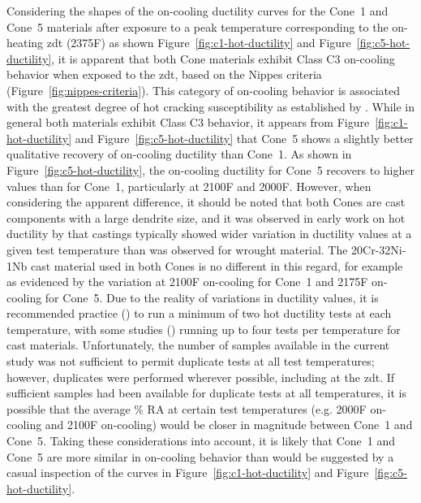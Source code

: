 Considering the shapes of the on-cooling ductility curves for the Cone~1 and Cone~5 materials after exposure to a peak temperature corresponding to the on-heating \gls{zdt} (2375\textdegree{}F) as shown Figure~\ref{fig:c1-hot-ductility} and Figure~\ref{fig:c5-hot-ductility}, it is apparent that both Cone materials exhibit Class C3 on-cooling behavior when exposed to the \gls{zdt}, based on the Nippes criteria (Figure~\ref{fig:nippes-criteria}).  This category of on-cooling behavior is associated with the greatest degree of hot cracking susceptibility as established by \citet{nippes_further_1957}.  While in general both materials exhibit Class C3 behavior, it appears from Figure~\ref{fig:c1-hot-ductility} and Figure~\ref{fig:c5-hot-ductility} that Cone~5 shows a slightly better qualitative recovery of on-cooling ductility than Cone~1.  As shown in Figure~\ref{fig:c5-hot-ductility}, the on-cooling ductility for Cone~5 recovers to higher values than for Cone~1, particularly at 2100\textdegree{}F and 2000\textdegree{}F.  However, when considering the apparent difference, it should be noted that both Cones are cast components with a large dendrite size, and it was observed in early work on hot ductility by \citet{nippes_further_1957} that castings typically showed wider variation in ductility values at a given test temperature than was observed for wrought material.  The 20Cr-32Ni-1Nb cast material used in both Cones is no different in this regard, for example as evidenced by the variation at 2100\textdegree{}F on-cooling for Cone~1 and 2175\textdegree{}F on-cooling for Cone~5.  Due to the reality of variations in ductility values, it is recommended practice (\citet{lundin_standardization_1990_experiment}) to run a minimum of two hot ductility tests at each temperature, with some studies (\citet{nippes_further_1957}) running up to four tests per temperature for cast materials.  Unfortunately, the number of samples available in the current study was not sufficient to permit duplicate tests at all test temperatures; however, duplicates were performed wherever possible, including at the \gls{zdt}.  If sufficient samples had been available for duplicate tests at all temperatures, it is possible that the average \% RA at certain test temperatures (e.g. 2000\textdegree{}F on-cooling and 2100\textdegree{}F on-cooling) would be closer in magnitude between Cone~1 and Cone~5.  Taking these considerations into account, it is likely that Cone~1 and Cone~5 are more similar in on-cooling behavior than would be suggested by a casual inspection of the curves in Figure~\ref{fig:c1-hot-ductility} and Figure~\ref{fig:c5-hot-ductility}.


